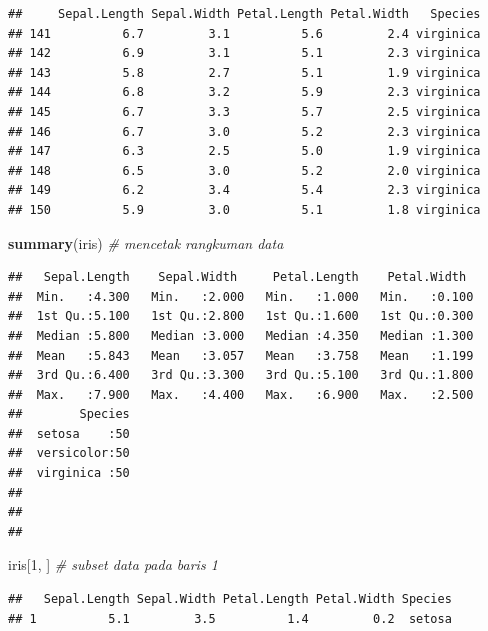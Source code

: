\documentclass[]{article}
\newenvironment{Shaded}{\begin{snugshade}}{\end{snugshade}}
\newcommand{\CommentTok}[1]{\textcolor[rgb]{0.56,0.35,0.01}{\textit{#1}}}
\newcommand{\DecValTok}[1]{\textcolor[rgb]{0.00,0.00,0.81}{#1}}
\newcommand{\KeywordTok}[1]{\textcolor[rgb]{0.13,0.29,0.53}{\textbf{#1}}}
\newcommand{\NormalTok}[1]{#1}
\begin{document}
\begin{verbatim}
##     Sepal.Length Sepal.Width Petal.Length Petal.Width   Species
## 141          6.7         3.1          5.6         2.4 virginica
## 142          6.9         3.1          5.1         2.3 virginica
## 143          5.8         2.7          5.1         1.9 virginica
## 144          6.8         3.2          5.9         2.3 virginica
## 145          6.7         3.3          5.7         2.5 virginica
## 146          6.7         3.0          5.2         2.3 virginica
## 147          6.3         2.5          5.0         1.9 virginica
## 148          6.5         3.0          5.2         2.0 virginica
## 149          6.2         3.4          5.4         2.3 virginica
## 150          5.9         3.0          5.1         1.8 virginica
\end{verbatim}

\begin{Shaded}
\begin{Highlighting}[]
\KeywordTok{summary}\NormalTok{(iris) }\CommentTok{# mencetak rangkuman data}
\end{Highlighting}
\end{Shaded}

\begin{verbatim}
##   Sepal.Length    Sepal.Width     Petal.Length    Petal.Width   
##  Min.   :4.300   Min.   :2.000   Min.   :1.000   Min.   :0.100  
##  1st Qu.:5.100   1st Qu.:2.800   1st Qu.:1.600   1st Qu.:0.300  
##  Median :5.800   Median :3.000   Median :4.350   Median :1.300  
##  Mean   :5.843   Mean   :3.057   Mean   :3.758   Mean   :1.199  
##  3rd Qu.:6.400   3rd Qu.:3.300   3rd Qu.:5.100   3rd Qu.:1.800  
##  Max.   :7.900   Max.   :4.400   Max.   :6.900   Max.   :2.500  
##        Species  
##  setosa    :50  
##  versicolor:50  
##  virginica :50  
##                 
##                 
## 
\end{verbatim}

\begin{Shaded}
\begin{Highlighting}[]
\NormalTok{iris[}\DecValTok{1}\NormalTok{, ] }\CommentTok{# subset data pada baris 1}
\end{Highlighting}
\end{Shaded}

\begin{verbatim}
##   Sepal.Length Sepal.Width Petal.Length Petal.Width Species
## 1          5.1         3.5          1.4         0.2  setosa
\end{verbatim}
\end{document}
